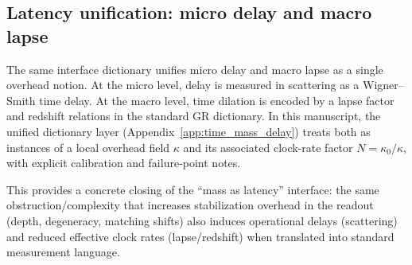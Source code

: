 \subsection{Latency unification: micro delay and macro lapse}
\label{subsec:latency_unification}

The same interface dictionary unifies micro delay and macro lapse as a single overhead notion.
At the micro level, delay is measured in scattering as a Wigner--Smith time delay.
At the macro level, time dilation is encoded by a lapse factor and redshift relations in the standard GR dictionary.
\InterfaceTag In this manuscript, the unified dictionary layer (Appendix~\ref{app:time_mass_delay}) treats both as instances of a local overhead field $\kappa$ and its associated clock-rate factor $N=\kappa_0/\kappa$, with explicit calibration and failure-point notes.

This provides a concrete closing of the ``mass as latency'' interface: the same obstruction/complexity that increases stabilization overhead in the readout (depth, degeneracy, matching shifts) also induces operational delays (scattering) and reduced effective clock rates (lapse/redshift) when translated into standard measurement language.

 

